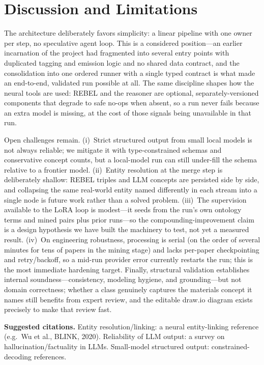 \documentclass[Afour,sageh,times]{sagej}
\newcommand{\readingnote}[1]{%
  \par\smallskip\noindent\colorbox{gray!12}{%
  \parbox{\dimexpr\linewidth-2\fboxsep}{\footnotesize\textbf{Suggested citations.} #1}}\par}
\begin{document}
\section{Discussion and Limitations}
The architecture deliberately favors simplicity: a linear pipeline with one owner per step, no
speculative agent loop. This is a considered position---an earlier incarnation of the project had
fragmented into several entry points with duplicated tagging and emission logic and no shared data
contract, and the consolidation into one ordered runner with a single typed contract is what made an
end-to-end, validated run possible at all. The same discipline shapes how the neural tools are used:
REBEL and the reasoner are optional, separately-versioned components that degrade to safe no-ops when
absent, so a run never fails because an extra model is missing, at the cost of those signals being
unavailable in that run.

Open challenges remain. (i)~Strict structured output from small local models is not always reliable;
we mitigate it with type-constrained schemas and conservative concept counts, but a local-model run can
still under-fill the schema relative to a frontier model. (ii)~Entity resolution at the merge step is
deliberately shallow: REBEL triples and LLM concepts are persisted side by side, and collapsing the
same real-world entity named differently in each stream into a single node is future work rather than a
solved problem. (iii)~The supervision available to the LoRA loop is modest---it seeds from the run's own
ontology terms and mined pairs plus prior runs---so the compounding-improvement claim is a design
hypothesis we have built the machinery to test, not yet a measured result. (iv)~On engineering
robustness, processing is serial (on the order of several minutes for tens of papers in the mining
stage) and lacks per-paper checkpointing and retry/backoff, so a mid-run provider error currently
restarts the run; this is the most immediate hardening target. Finally, structural validation
establishes internal soundness---consistency, modeling hygiene, and grounding---but not domain
correctness; whether a class genuinely captures the materials concept it names still benefits from
expert review, and the editable draw.io diagram exists precisely to make that review fast.
\readingnote{Entity resolution/linking: a neural entity-linking reference (e.g.\ Wu et al., BLINK,
2020). Reliability of LLM output: a survey on hallucination/factuality in LLMs. Small-model
structured output: constrained-decoding references.}
\end{document}
